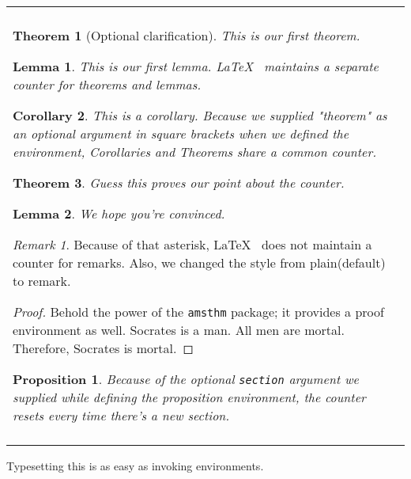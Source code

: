 \documentclass[12pt, letterpaper]{article}
\newtheorem{theorem}{Theorem}
\newtheorem{lemma}{Lemma}
\newtheorem{corollary}[theorem]{Corollary}
\newtheorem{proposition}{Proposition}[section]
\theoremstyle{remark}
\newtheorem*{remark}{Remark}
\renewenvironment{boxed}
    {\begin{center}
    \begin{tabular}{|p{0.9\textwidth}|}
    \hline\\
    }
    { 
    \\\\\hline
    \end{tabular} 
    \end{center}
    }
\begin{document}
\begin{boxed}
\begin{theorem}[Optional clarification]
\label{mytheorem}
This is our first theorem.
\end{theorem}

\begin{lemma}
\label{mylemma}
This is our first lemma. \LaTeX~ maintains a separate counter for theorems and lemmas.
\end{lemma}

\begin{corollary}
\label{mycorollary}
This is a corollary. Because we supplied "theorem" as an optional argument in square brackets when we defined the environment, Corollaries and Theorems share a common counter.
\end{corollary}

\begin{theorem}
\label{mytheoremagain}
Guess this proves our point about the counter.
\end{theorem}

\begin{lemma}
\label{mylemmaagain}
We hope you're convinced.
\end{lemma}

\begin{remark}
Because of that asterisk, \LaTeX~ does not maintain a counter for remarks. Also, we changed the style from plain(default) to remark. 
\end{remark}

\begin{proof}
Behold the power of the \verb!amsthm! package; it provides a proof environment as well. Socrates is a man. All men are mortal. Therefore, Socrates is mortal.
\end{proof}

\vspace{1em}

\begin{proposition}
\label{myfirstproposition}
Because of the optional \verb!section! argument we supplied while defining the proposition environment, the counter resets every time there's a new section.
\end{proposition}

\end{boxed}

Typesetting this is as easy as invoking environments.
\end{document}
